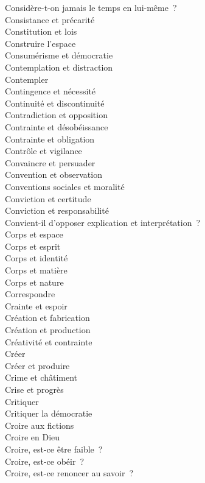 \documentclass[a4paper,12pt]{article}
\begin{document}
Considère-t-on jamais le temps en lui-même ? \\
Consistance et précarité \\
Constitution et lois \\
Construire l'espace \\
Consumérisme et démocratie \\
Contemplation et distraction \\
Contempler \\
Contingence et nécessité \\
Continuité et discontinuité \\
Contradiction et opposition \\
Contrainte et désobéissance \\
Contrainte et obligation \\
Contrôle et vigilance \\
Convaincre et persuader \\
Convention et observation \\
Conventions sociales et moralité \\
Conviction et certitude \\
Conviction et responsabilité \\
Convient-il d'opposer explication et interprétation ? \\
Corps et espace \\
Corps et esprit \\
Corps et identité \\
Corps et matière \\
Corps et nature \\
Correspondre \\
Crainte et espoir \\
Création et fabrication \\
Création et production \\
Créativité et contrainte \\
Créer \\
Créer et produire \\
Crime et châtiment \\
Crise et progrès \\
Critiquer \\
Critiquer la démocratie \\
Croire aux fictions \\
Croire en Dieu \\
Croire, est-ce être faible ? \\
Croire, est-ce obéir ? \\
Croire, est-ce renoncer au savoir ? \\
\end{document}
